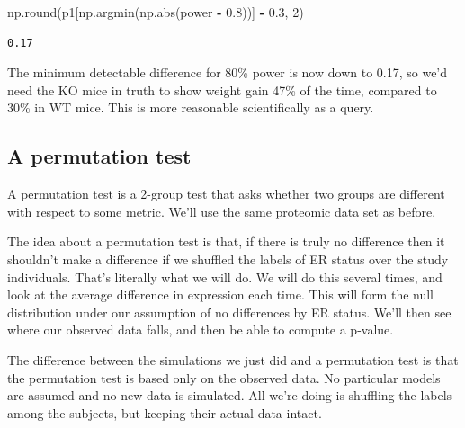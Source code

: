 \documentclass[
  letterpaper,
]{scrbook}
\newenvironment{Shaded}{\begin{snugshade}}{\end{snugshade}}
\newcommand{\BuiltInTok}[1]{#1}
\newcommand{\DecValTok}[1]{\textcolor[rgb]{0.00,0.00,0.81}{#1}}
\newcommand{\FloatTok}[1]{\textcolor[rgb]{0.00,0.00,0.81}{#1}}
\newcommand{\NormalTok}[1]{#1}
\newcommand{\OperatorTok}[1]{\textcolor[rgb]{0.81,0.36,0.00}{\textbf{#1}}}
\begin{document}
\begin{Shaded}
\begin{Highlighting}[]
\NormalTok{np.}\BuiltInTok{round}\NormalTok{(p1[np.argmin(np.}\BuiltInTok{abs}\NormalTok{(power }\OperatorTok{-} \FloatTok{0.8}\NormalTok{))] }\OperatorTok{-} \FloatTok{0.3}\NormalTok{, }\DecValTok{2}\NormalTok{)}
\end{Highlighting}
\end{Shaded}

\begin{verbatim}
0.17
\end{verbatim}

The minimum detectable difference for 80\% power is now down to 0.17, so we'd need the KO mice in truth to show weight gain 47\% of the time, compared to 30\% in WT mice. This is more reasonable scientifically as a query.

\hypertarget{a-permutation-test}{%
\subsection{A permutation test}\label{a-permutation-test}}

A permutation test is a 2-group test that asks whether two groups are different with respect to some metric. We'll use the same proteomic data set as before.

The idea about a permutation test is that, if there is truly no difference then it shouldn't make a difference if we shuffled the labels of ER status over the study individuals. That's literally what we will do. We will do this several times, and look at the average difference in expression each time. This will form the null distribution under our assumption of no differences by ER status. We'll then see where our observed data falls, and then be able to compute a p-value.

The difference between the simulations we just did and a permutation test is that the permutation test is based only on the observed data. No particular models are assumed and no new data is simulated. All we're doing is shuffling the labels among the subjects, but keeping their actual data intact.
\end{document}
